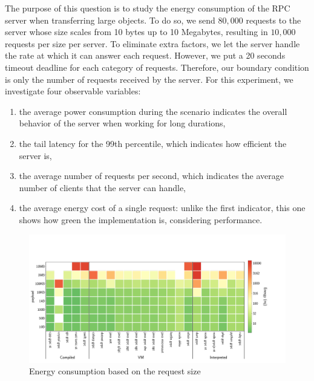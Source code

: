 The purpose of this question is to study the energy consumption of the RPC server when transferring large objects.
To do so, we send $80,000$ requests to the server whose size scales from 10 bytes up to 10 Megabytes, resulting in $10,000$ requests per size per server.
To eliminate extra factors, we let the server handle the rate at which it can answer each request.
However, we put a 20 seconds timeout deadline for each category of requests.
Therefore, our boundary condition is only the number of requests received by the server.
For this experiment, we investigate four observable variables:
\begin{enumerate}
    \item the \textsf{average power consumption} during the scenario indicates the overall behavior of the server when working for long durations,
    \item the \textsf{tail latency} for the 99th percentile, which indicates how efficient the server is,
    \item the \textsf{average number of requests per second}, which indicates the average number of clients that the server can handle,
    \item the \textsf{average energy cost} of a single request: unlike the first indicator, this one shows how green the implementation is, considering performance.
\end{enumerate}


\begin{figure}[!hbt]
    \begin{center}
        \includegraphics[width=1.2\linewidth]{imgs/energy_cost_payload}
    \end{center}
    \caption{Energy consumption based on the request size}\label{fig:energy_cost_payload}
\end{figure}


